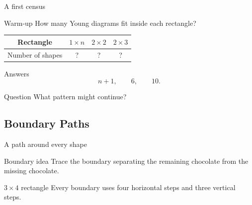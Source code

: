 \documentclass{beamer}
\begin{document}
\begin{frame}{A first census}
  \begin{block}{Warm-up}
    How many Young diagrams fit inside each rectangle?
  \end{block}
  \begin{center}
    \begin{tabular}{c|c|c|c}
      Rectangle & $1\times n$ & $2\times2$ & $2\times3$ \\
      \hline
      Number of shapes & ? & ? & ?
    \end{tabular}
  \end{center}
\pause
  \begin{block}{Answers}
    \[
      n+1, \qquad 6, \qquad 10.
    \]
  \end{block}
\pause
  \begin{block}{Question}
    What pattern might continue?
  \end{block}
\end{frame}

\subsection{Boundary Paths}

\begin{frame}{A path around every shape}
\small
  \begin{block}{Boundary idea}
    Trace the boundary separating the remaining chocolate from the
    missing chocolate.
  \end{block}
\pause
  \begin{center}
  \end{center}
\pause
  \begin{block}{$3\times4$ rectangle}
    Every boundary uses four horizontal steps and three vertical steps.
  \end{block}
\end{frame}
\end{document}
